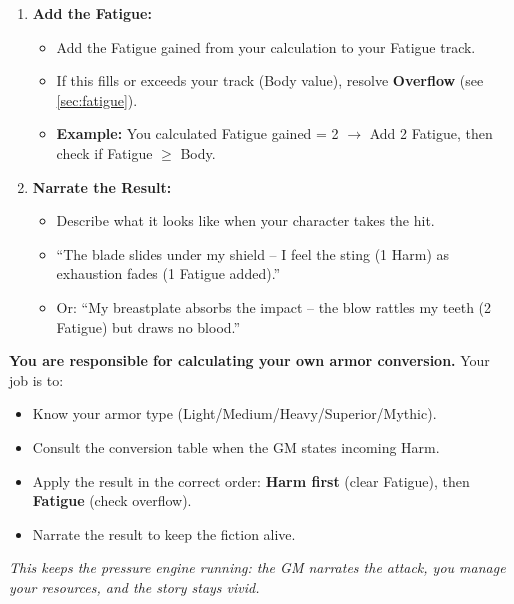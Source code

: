 \begin{enumerate}
  \item \textbf{Add the Fatigue:}
        \begin{itemize}
          \item Add the Fatigue gained from your calculation to your Fatigue track.
          \item If this fills or exceeds your track (Body value), resolve \textbf{Overflow} (see \ref{sec:fatigue}).
        \end{itemize}
        \begin{itemize}
          \item \textbf{Example:} You calculated Fatigue gained = 2 $\to$ Add 2 Fatigue, then check if Fatigue $\geq$ Body.
        \end{itemize}

  \item \textbf{Narrate the Result:}
        \begin{itemize}
          \item Describe what it looks like when your character takes the hit.
          \item ``The blade slides under my shield -- I feel the sting (1 Harm) as exhaustion fades (1 Fatigue added).''
          \item Or: ``My breastplate absorbs the impact -- the blow rattles my teeth (2 Fatigue) but draws no blood.''
        \end{itemize}
\end{enumerate}

\begin{tcolorbox}[colback=yellow!5!white,colframe=yellow!75!black,title=\textbf{Player Tip: Own Your Conversion},breakable]
\textbf{You are responsible for calculating your own armor conversion.} Your job is to:
\begin{itemize}
  \item Know your armor type (Light/Medium/Heavy/Superior/Mythic).
  \item Consult the conversion table when the GM states incoming Harm.
  \item Apply the result in the correct order: \textbf{Harm first} (clear Fatigue), then \textbf{Fatigue} (check overflow).
  \item Narrate the result to keep the fiction alive.
\end{itemize}
\textit{This keeps the pressure engine running: the GM narrates the attack, you manage your resources, and the story stays vivid.}
\end{tcolorbox}

